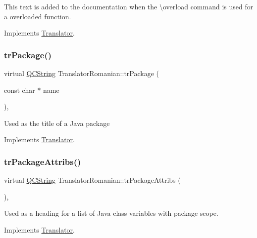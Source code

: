 This text is added to the documentation when the \textbackslash{}overload command is used for a overloaded function. 

Implements \mbox{\hyperlink{class_translator}{Translator}}.

\mbox{\label{class_translator_romanian_a32d1c45bdff5ae2fdec12e3491de569f}} 
\subsubsection{\texorpdfstring{trPackage()}{trPackage()}}
{\footnotesize\ttfamily virtual \mbox{\hyperlink{class_q_c_string}{Q\+C\+String}} Translator\+Romanian\+::tr\+Package (\begin{DoxyParamCaption}\item[{const char $\ast$}]{name }\end{DoxyParamCaption})\hspace{0.3cm}{\ttfamily [inline]}, {\ttfamily [virtual]}}

Used as the title of a Java package 

Implements \mbox{\hyperlink{class_translator}{Translator}}.

\mbox{\label{class_translator_romanian_a7779d20c3681246d213788375c518022}} 
\subsubsection{\texorpdfstring{trPackageAttribs()}{trPackageAttribs()}}
{\footnotesize\ttfamily virtual \mbox{\hyperlink{class_q_c_string}{Q\+C\+String}} Translator\+Romanian\+::tr\+Package\+Attribs (\begin{DoxyParamCaption}{ }\end{DoxyParamCaption})\hspace{0.3cm}{\ttfamily [inline]}, {\ttfamily [virtual]}}

Used as a heading for a list of Java class variables with package scope. 

Implements \mbox{\hyperlink{class_translator}{Translator}}.

\mbox{\label{class_translator_romanian_affdd7ecff1f29583ba8857a4fbfd7679}} 
